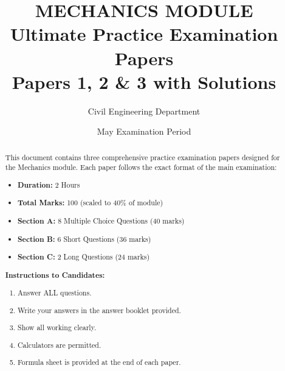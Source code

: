 \documentclass[12pt,a4paper]{article}
\title{\vspace{-2cm}\textbf{\Huge MECHANICS MODULE}\\[0.5cm]
\Large Ultimate Practice Examination Papers\\[0.3cm]
\normalsize Papers 1, 2 \& 3 with Solutions}
\author{Civil Engineering Department}
\date{May Examination Period}
\begin{document}
\maketitle

\begin{abstract}
\noindent This document contains three comprehensive practice examination papers designed for the Mechanics module. Each paper follows the exact format of the main examination:
\begin{itemize}
    \item \textbf{Duration:} 2 Hours
    \item \textbf{Total Marks:} 100 (scaled to 40\% of module)
    \item \textbf{Section A:} 8 Multiple Choice Questions (40 marks)
    \item \textbf{Section B:} 6 Short Questions (36 marks)
    \item \textbf{Section C:} 2 Long Questions (24 marks)
\end{itemize}
\vspace{0.5cm}

\noindent\textbf{Instructions to Candidates:}
\begin{enumerate}
    \item Answer ALL questions.
    \item Write your answers in the answer booklet provided.
    \item Show all working clearly.
    \item Calculators are permitted.
    \item Formula sheet is provided at the end of each paper.
\end{enumerate}
\end{abstract}

\newpage
\end{document}
